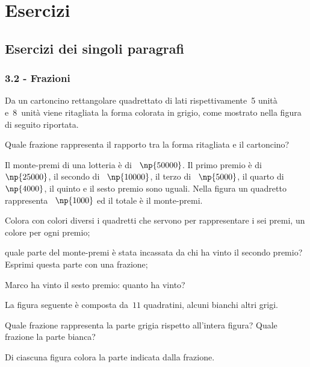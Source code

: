 \section{Esercizi}
\subsection{Esercizi dei singoli paragrafi}
\subsubsection*{3.2 - Frazioni}

\begin{esercizio}[\Ast]
\label{ese:3.1}
Da un cartoncino rettangolare quadrettato di lati rispettivamente~5 unità e~8~unità viene ritagliata
la forma colorata in grigio, come mostrato nella figura di seguito riportata.
\begin{center}
 
\end{center}
Quale frazione rappresenta il rapporto tra la forma ritagliata e il cartoncino?
\end{esercizio}

\begin{esercizio}
\label{ese:3.2}
Il monte-premi di una lotteria è di \officialeuro~$\np{50000}$. Il primo premio è di \officialeuro~$\np{25000}$, il secondo di
\officialeuro~$\np{10000}$, il terzo di \officialeuro~$\np{5000}$, il quarto di \officialeuro~$\np{4000}$, il quinto e il sesto premio sono uguali.
Nella figura un quadretto rappresenta \officialeuro~$\np{1000}$ ed il totale è il monte-premi.
\begin{center}
 
\end{center}
\begin{enumeratea}
 \item Colora con colori diversi i quadretti che servono per rappresentare i sei premi, un colore per ogni premio;
 \item quale parte del monte-premi è stata incassata da chi ha vinto il secondo premio?
	Esprimi questa parte con una frazione;
 \item Marco ha vinto il sesto premio: quanto ha vinto?
\end{enumeratea}
\end{esercizio}

\begin{esercizio}[\Ast]
 \label{ese:3.3}
La figura seguente è composta da~$11$ quadratini, alcuni bianchi altri grigi.
\begin{center}
 
\end{center}
Quale frazione rappresenta la parte grigia rispetto all'intera figura? Quale frazione la parte bianca?
\end{esercizio}
\pagebreak
\begin{esercizio}
 \label{ese:3.4}
 Di ciascuna figura colora la parte indicata dalla frazione.
\begin{center}
 
\end{center}
\end{esercizio}

